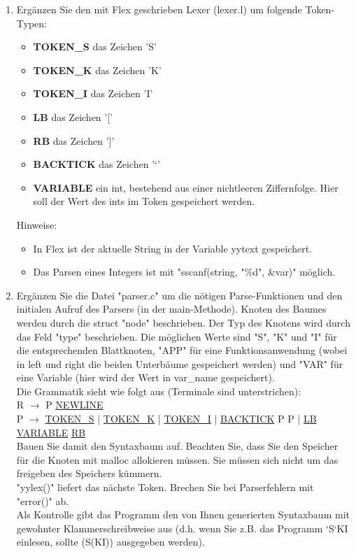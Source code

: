 \documentclass{scrartcl}
\begin{document}
\begin{enumerate}[1.]
\item Ergänzen Sie den mit Flex geschrieben Lexer (lexer.l) um folgende Token-Typen:
\begin{itemize}
\item \textbf{TOKEN\_S} das Zeichen 'S'
\item \textbf{TOKEN\_K} das Zeichen 'K'
\item \textbf{TOKEN\_I} das Zeichen 'I'
\item \textbf{LB} das Zeichen '['
\item \textbf{RB} das Zeichen ']'
\item \textbf{BACKTICK} das Zeichen '`'
\item \textbf{VARIABLE} ein int, bestehend aus einer nichtleeren Ziffernfolge. Hier soll der Wert des ints im Token gespeichert werden.
\end{itemize}
Hinweise:
\begin{itemize}
\item In Flex ist der aktuelle String in der Variable yytext gespeichert.
\item Das Parsen eines Integers ist mit "sscanf(string, "\%d", \&var)" möglich.
\end{itemize}

\item Ergänzen Sie die Datei "parser.c" um die nötigen Parse-Funktionen und den initialen Aufruf des Parsers (in der main-Methode). Knoten des Baumes werden durch die struct "node" beschrieben. Der Typ des Knotens wird durch das Feld "type" beschrieben. Die möglichen Werte sind "S", "K" und "I" für die entsprechenden Blattknoten, "APP" für eine Funktionsanwendung (wobei in left und right die beiden Unterbäume gespeichert werden) und "VAR" für eine Variable (hier wird der Wert in var\_name gespeichert).\\
Die Grammatik sieht wie folgt aus (Terminale sind unterstrichen):\\
R $\to$ P \underline{NEWLINE}\\
P $\to$ \underline{TOKEN\_S} | \underline{TOKEN\_K} | \underline{TOKEN\_I} | \underline{BACKTICK} P P | \underline{LB} \underline{VARIABLE} \underline{RB}\\
Bauen Sie damit den Syntaxbaum auf. Beachten Sie, dass Sie den Speicher für die Knoten mit malloc allokieren müssen. Sie müssen sich nicht um das freigeben des Speichers kümmern.\\
"yylex()" liefert das nächste Token. Brechen Sie bei Parserfehlern mit "error()" ab.\\
Als Kontrolle gibt das Programm den von Ihnen generierten Syntaxbaum mit gewohnter Klammerschreibweise aus (d.h. wenn Sie z.B. das Programm `S`KI einlesen, sollte (S(KI)) ausgegeben werden).


\end{enumerate}
\end{document}
